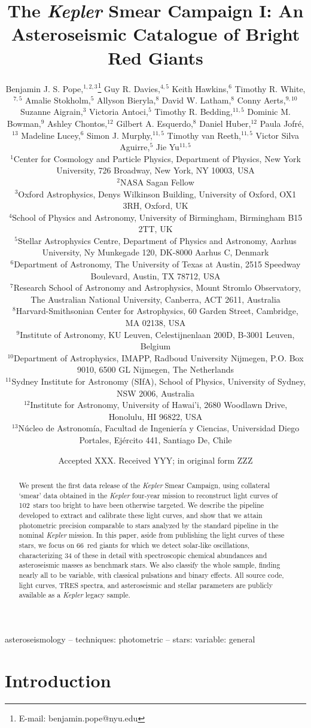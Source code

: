 \documentclass[a4paper,fleqn,usenatbib]{mnras}
\title[The Kepler Smear Campaign]{The \textit{Kepler} Smear Campaign I: An Asteroseismic Catalogue of Bright Red Giants}
\author[B. J. S. Pope et al.]{Benjamin J. S. Pope,$^{1,2,3}$\thanks{E-mail: benjamin.pope@nyu.edu}
Guy R. Davies,$^{4,5}$
Keith Hawkins,$^{6}$
Timothy R. White,$^{7,5}$\newauthor
Amalie Stokholm,$^{5}$
Allyson Bieryla,$^{8}$
David W. Latham,$^{8}$
Conny Aerts,$^{9,10}$\newauthor
Suzanne Aigrain,$^{3}$ 
Victoria Antoci,$^{5}$
Timothy R. Bedding,$^{11,5}$
Dominic M. Bowman,$^{9}$\newauthor
Ashley Chontos,$^{12}$
Gilbert A. Esquerdo,$^{8}$
Daniel Huber,$^{12}$
Paula Jofr\'{e},$^{13}$\newauthor
Madeline Lucey,$^{6}$
Simon J. Murphy,$^{11,5}$
Timothy van Reeth,$^{11,5}$\newauthor
Victor Silva Aguirre,$^{5}$
Jie Yu$^{11,5}$ 
\\
$^{1}$Center for Cosmology and Particle Physics, Department of Physics, New York University, 726 Broadway, New York, NY 10003, USA\\
$^{2}$NASA Sagan Fellow\\
$^{3}$Oxford Astrophysics, Denys Wilkinson Building, University of Oxford, OX1 3RH, Oxford, UK\\
$^{4}$School of Physics and Astronomy, University of Birmingham, Birmingham B15 2TT, UK\\
$^{5}$Stellar Astrophysics Centre, Department of Physics and Astronomy, Aarhus University, Ny Munkegade 120, DK-8000 Aarhus C, Denmark\\
$^{6}$Department of Astronomy, The University of Texas at Austin, 2515 Speedway Boulevard, Austin, TX 78712, USA\\
$^{7}$Research School of Astronomy and Astrophysics, Mount Stromlo Observatory, The Australian National University, Canberra, ACT 2611, Australia\\
$^{8}$Harvard-Smithsonian Center for Astrophysics, 60 Garden Street, Cambridge, MA 02138, USA\\
$^{9}$Institute of Astronomy, KU Leuven, Celestijnenlaan 200D, B-3001 Leuven, Belgium\\
$^{10}$Department of Astrophysics, IMAPP, Radboud University Nijmegen, P.O. Box 9010, 6500 GL Nijmegen, The Netherlands\\
$^{11}$Sydney Institute for Astronomy (SIfA), School of Physics, University of Sydney, NSW 2006, Australia\\
$^{12}$Institute for Astronomy, University of Hawai'i, 2680 Woodlawn Drive, Honolulu, HI 96822, USA\\
$^{13}$N\'{u}cleo de Astronom\'{i}a, Facultad de Ingenier\'{i}a y Ciencias, Universidad Diego Portales, Ej\'{e}rcito 441, Santiago De, Chile\\
}
\date{Accepted XXX. Received YYY; in original form ZZZ}
\newcommand{\kepler}{\textit{Kepler}\xspace}
\begin{document}
\label{firstpage}
\pagerange{\pageref{firstpage}--\pageref{lastpage}}
\maketitle

\begin{abstract}
We present the first data release of the \kepler Smear Campaign, using collateral `smear' data obtained in the \kepler four-year mission to reconstruct light curves of 102~stars too bright to have been otherwise targeted. We describe the pipeline developed to extract and calibrate these light curves, and show that we attain photometric precision comparable to stars analyzed by the standard pipeline in the nominal \kepler mission. In this paper, aside from publishing the light curves of these stars, we focus on 66~red giants for which we detect solar-like oscillations, characterizing 34 of these in detail with spectroscopic chemical abundances and asteroseismic masses as benchmark stars. We also classify the whole sample, finding nearly all to be variable, with classical pulsations and binary effects. All source code, light curves, TRES spectra, and asteroseismic and stellar parameters are publicly available as a \kepler legacy sample.
\end{abstract}

\begin{keywords}
asteroseismology -- techniques: photometric -- stars: variable: general
\end{keywords}



\section{Introduction}
\label{intro}

\end{document}
